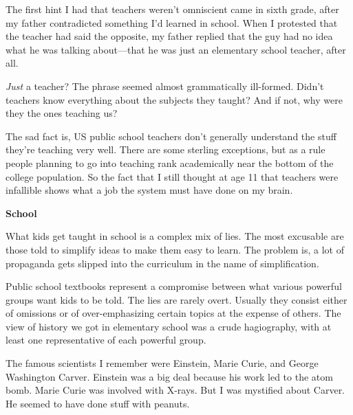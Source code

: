 The first hint I had that teachers
                  weren't omniscient came in sixth grade, after my father
                  contradicted something I'd learned in school. When I protested
                  that the teacher had said the opposite, my father replied that
                  the guy had no idea what he was talking about---that he
                  was just an elementary school teacher, after all.

\emph{Just}
                  a teacher? The phrase seemed almost grammatically ill-formed.
                  Didn't teachers know everything about the subjects they
                  taught? And if not, why were they the ones teaching us?

The
                  sad fact is, US public school teachers don't generally
                  understand the stuff they're teaching very well. There are
                  some sterling exceptions, but as a rule people planning to go
                  into teaching rank academically near the bottom of the college
                  population. So the fact that I still thought at age 11 that
                  teachers were infallible shows what a job the system must have
                  done on my brain.


                  \textbf{School}

What kids get taught in school is a
                  complex mix of lies. The most excusable are those told to
                  simplify ideas to make them easy to learn. The problem is, a
                  lot of propaganda gets slipped into the curriculum in the name
                  of simplification.

Public school textbooks
                  represent a compromise between what various powerful groups
                  want kids to be told. The lies are rarely overt. Usually they
                  consist either of omissions or of over-emphasizing certain
                  topics at the expense of others. The view of history we got in
                  elementary school was a crude hagiography, with at least one
                  representative of each powerful group.

The famous
                  scientists I remember were Einstein, Marie Curie, and George
                  Washington Carver. Einstein was a big deal because his work
                  led to the atom bomb. Marie Curie was involved with X-rays.
                  But I was mystified about Carver. He seemed to have done stuff
                  with peanuts.

